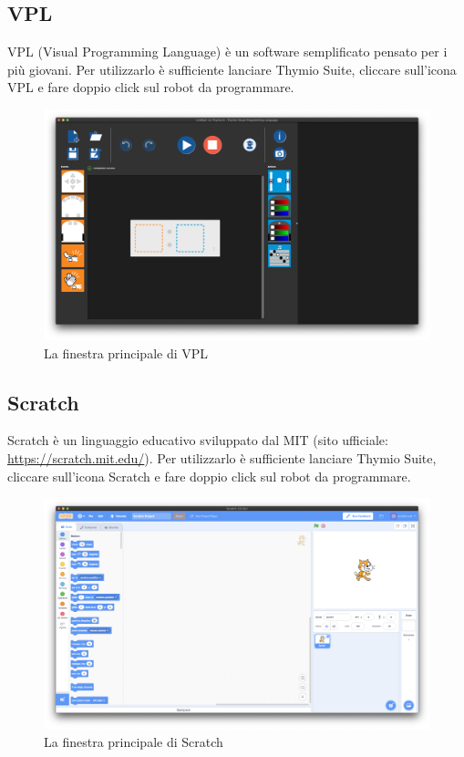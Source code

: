 \documentclass[12pt]{article}
\begin{document}
	\newpage
		
	\subsection{VPL}
	
		VPL (Visual Programming Language) è un software semplificato pensato per i più giovani. Per utilizzarlo è sufficiente lanciare Thymio Suite, cliccare sull'icona VPL e fare doppio click sul robot da programmare.
		
		\begin{figure}[H]
			\includegraphics[width=\textwidth]{img/vpl.png}
			\caption{La finestra principale di VPL}
			\label{main_vpl}
		\end{figure}
		
	\newpage
		
	\subsection{Scratch}
	
		Scratch è un linguaggio educativo sviluppato dal MIT (sito ufficiale: \url{https://scratch.mit.edu/}). Per utilizzarlo è sufficiente lanciare Thymio Suite, cliccare sull'icona Scratch e fare doppio click sul robot da programmare.
		
		\begin{figure}[H]
			\includegraphics[width=\textwidth]{img/scratch.png}
			\caption{La finestra principale di Scratch}
			\label{main_scratch}
		\end{figure}
		
\end{document}

